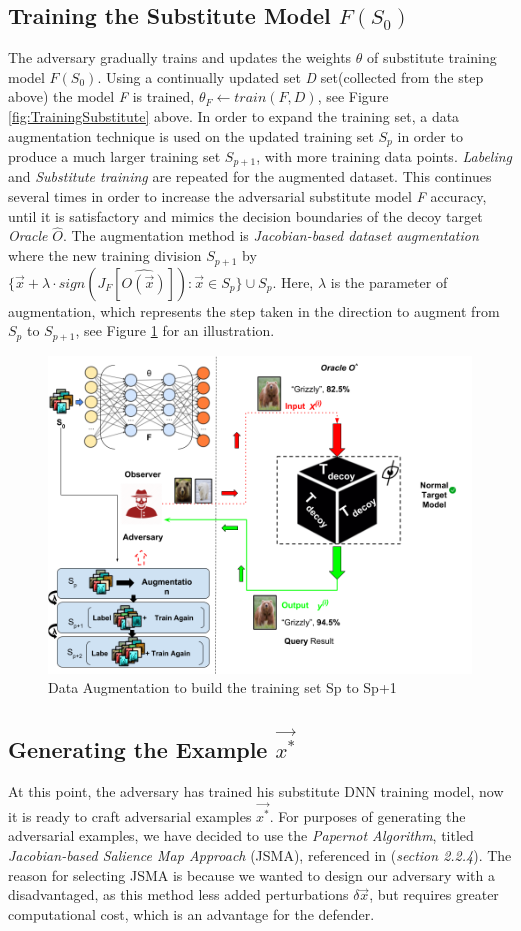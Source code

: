 \documentclass[grad,lot,lof,11pt,oneside,onehalfspace]{RUthesis}
\begin{document}
\subsection{Training the Substitute Model \textbf{$F(S_{0})$}} 
The adversary gradually trains and updates the weights $\theta$ of substitute training model \textit{$F(S_{0})$}.  Using a continually updated set \textit{D} set(collected from the step above) the model \textit{F} is trained, \textit{$\theta_{F} \longleftarrow train(F,D)$}, see Figure \ref{fig:TrainingSubstitute} above. In order to expand the training set, a data augmentation technique is used on the updated training set $S_{p}$ in order to produce a much larger training set $S_{p+1}$, with more training data points. \textit{Labeling} and \textit{Substitute training} are repeated for the augmented dataset. This continues several times in order to increase the adversarial substitute model \textit{F} accuracy, until it is satisfactory and mimics the decision boundaries of the decoy target \textit{Oracle} \textit{$\hat{O}$}. The augmentation method is \textit{Jacobian-based dataset augmentation} where the new training division \textit{$S_{p+1}$} by \textit{${\{\vec{x}+\lambda \cdotp sign(J_{F}[\hat{O(\vec{x})}]):\vec{x}\in S_{p}\}} \cup S_{p}$}. Here, $\lambda$ is the parameter of augmentation, which represents the step taken in the direction to augment from $S_{p}$ to $S_{p+1}$, see Figure \ref{fig:Augmentation} for an illustration.   
\begin{figure}[h]
\centering
\includegraphics[width=0.7\linewidth]{"Images/Chapter 4/Augmentation"}
\caption{Data Augmentation to build the training set Sp to Sp+1}
\label{fig:Augmentation}
\end{figure}

\subsection{Generating the Example \textbf{$\vec{x^{*}}$}}
At this point, the adversary has trained his substitute DNN training model, now it is ready to craft adversarial examples \textit{$\vec{x^{*}}$}. For purposes of generating the adversarial examples, we have decided to use the \textit{Papernot Algorithm}, titled \textit{Jacobian-based Salience Map Approach} (JSMA), referenced in (\textit{section 2.2.4}). The reason for selecting JSMA is because we wanted to design our adversary with a disadvantaged, as this method less added perturbations $\delta \vec{x}$, but requires greater computational cost, which is an advantage for the defender. 
\end{document}
